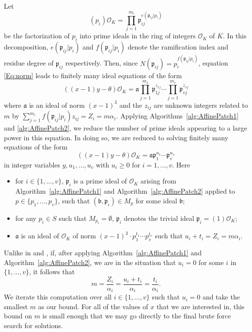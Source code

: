 Let 
\[(p_i)\mathcal{O}_K = \prod_{j = 1}^{m_i} \mathfrak{p}_{ij}^{e(\mathfrak{p}_{ij}|p_i)}\]
be the factorization of $p_i$ into prime ideals in the ring of integers $\mathcal{O}_K$ of $K$. In this decomposition, $e(\mathfrak{p}_{ij}|p_i)$ and $f(\mathfrak{p}_{ij}|p_i)$ denote the ramification index and residue degree of $\mathfrak{p}_{ij}$ respectively. Then, since $N(\mathfrak{p}_{ij}) = p_i^{f(\mathfrak{p}_{ij}|p_i)}$, equation \eqref{Eq:norm} leads to finitely many ideal equations of the form
\begin{equation} \label{Eq:ideals}
((x-1)y-\theta)\mathcal{O}_K = \mathfrak{a} \prod_{j = 1}^{m_1} \mathfrak{p}_{1j}^{z_{1j}} \cdots \prod_{j = 1}^{m_v} \mathfrak{p}_{vj}^{z_{vj}}
\end{equation}
where $\mathfrak{a}$ is an ideal of norm $(x-1)^3$ and the $z_{ij}$ are unknown integers related to $m$ by $\sum_{j = 1}^{m_i} f(\mathfrak{p}_{ij}|p_i)z_{ij} = Z_i = m \alpha_i$. 
Applying Algorithms~\ref{alg:AffinePatch1} and \ref{alg:AffinePatch2}, we reduce the number of prime ideals appearing to a large power in this equation. In doing so, we are reduced to solving finitely many equations of the form
\begin{equation}\label{Eq:TMfactored}
((x-1) y- \theta)\mathcal{O}_K=\mathfrak{a} \mathfrak{p}_1^{u_1}\cdots \mathfrak{p}_v^{u_v}
\end{equation}
in integer variables $y,u_1, \dots, u_v$ with $u_i \geq 0$ for $i = 1, \dots, v$. 
Here
\begin{itemize}
\item for $i \in \{1, \dots, v\}$, $\mathfrak{p}_i$ is a prime ideal of $\mathcal{O}_K$ arising from 
Algorithm~\ref{alg:AffinePatch1} and Algorithm~\ref{alg:AffinePatch2} applied to $p \in \{p_1, \dots, p_v\}$, such that $(\mathfrak{b}, \mathfrak{p}_i) \in M_p$ for some ideal $\mathfrak{b}$;
\item for any $p_i \in S$ such that $M_{p_i} = \emptyset$, $\mathfrak{p}_i$ denotes the trivial ideal $\mathfrak{p}_i = (1)\mathcal{O}_K$;
\item $\mathfrak{a}$ is an ideal of $\mathcal{O}_K$ of norm $(x-1)^3\cdot p_1^{t_1} \cdots p_v^{t_v}$ such that
$u_i + t_i =  Z_i = m\alpha_i$.
\end{itemize}

\begin{remark}\label{rem:uv}
Unlike in \cite{TW3} and \cite{GhKaMaSi}, if, after applying Algorithm~\ref{alg:AffinePatch1} and Algorithm~\ref{alg:AffinePatch2}, we are in the situation that $u_i = 0$ for some $i$ in $\{1, \dots, v\}$, it follows that
\[m = \frac{Z_i}{\alpha_i } =  \frac{u_i + t_i}{\alpha_i } = \frac{t_i}{\alpha_i }.\]
We iterate this computation over all $i \in \{1, \dots, v\}$ such that $u_i = 0$ and take the smallest $m$ as our bound. For all of the values of $x$ that we are interested in, this bound on $m$ is small enough that we may go directly to the final brute force search for solutions.
\end{remark}


